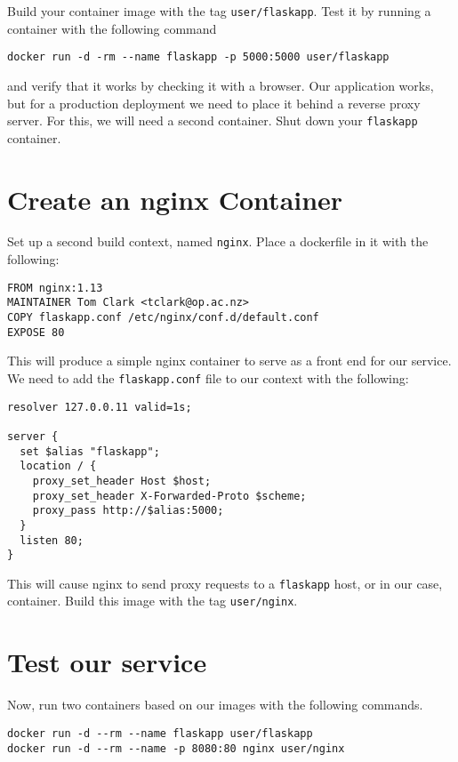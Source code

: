 \documentclass{article}
\begin{document}
Build your container image with the tag \texttt{user/flaskapp}. Test it by running a container with the following command

\begin{verbatim}
docker run -d -rm --name flaskapp -p 5000:5000 user/flaskapp
\end{verbatim}

and verify that it works by checking it with a browser.  Our application works, but for a production deployment we need to place it behind a reverse proxy server. For this, we will need a second container. Shut down your \texttt{flaskapp} container.

\section{Create an nginx Container}
Set up a second build context, named \texttt{nginx}. Place a dockerfile in it with the following:

\begin{verbatim}
FROM nginx:1.13
MAINTAINER Tom Clark <tclark@op.ac.nz>
COPY flaskapp.conf /etc/nginx/conf.d/default.conf
EXPOSE 80
\end{verbatim}

This will produce a simple nginx container to serve as a front end for our service. We need to add the \texttt{flaskapp.conf} file to our context with the following:

\begin{verbatim}
resolver 127.0.0.11 valid=1s;

server {  
  set $alias "flaskapp";
  location / {
    proxy_set_header Host $host;
    proxy_set_header X-Forwarded-Proto $scheme;
    proxy_pass http://$alias:5000;
  }
  listen 80;
}
\end{verbatim}

This will cause nginx to send proxy requests to a \texttt{flaskapp} host, or in our case, container. Build this image with the tag \texttt{user/nginx}.

\section{Test our service}

Now, run two containers based on our images with the following commands.

\begin{verbatim}
docker run -d --rm --name flaskapp user/flaskapp
docker run -d --rm --name -p 8080:80 nginx user/nginx
\end{verbatim}
\end{document}

